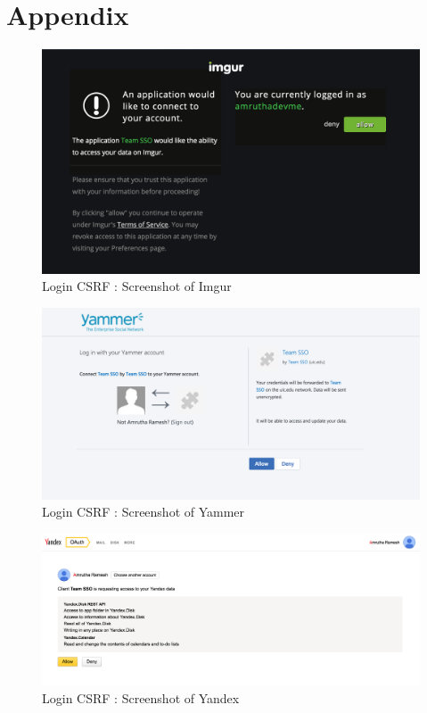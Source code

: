 \section{Appendix}
\label{sec:appendix}

\begin{figure}[t]
   		 \centering
   		 \includegraphics[width=\columnwidth]{figures/vulnerable/imgur1.png}
   		 \caption{Login CSRF : Screenshot of Imgur}
   		 \label{fig:imgurlogin}
	\end{figure}

\begin{figure}[t]
   		 \centering
   		 \includegraphics[width=\columnwidth]{figures/vulnerable/yammer2.png}
   		 \caption{Login CSRF : Screenshot of Yammer}
   		 \label{fig:yammerlogin}
	\end{figure}
\begin{figure}[t]
   		 \centering
   		 \includegraphics[width=\columnwidth]{figures/vulnerable/yandex1.png}
   		 \caption{Login CSRF : Screenshot of Yandex}
   		 \label{fig:yandexlogin}
	\end{figure}


